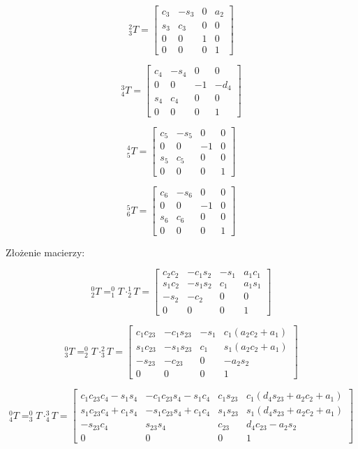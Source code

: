 \documentclass{article}
\begin{document}
\[
_{3}^{2}T=
\begin{bmatrix}
c_3	&-s_3	&0	&a_2	\\
s_3	&c_3	&0	&0	\\
0	&0	&1	&0	\\
0	&0	&0	&1	
 \end{bmatrix}
\]

\[
_{4}^{3}T=
\begin{bmatrix}
c_4	&-s_4	&0	&0	\\
0	&0	&-1	&-d_4	\\
s_4	&c_4	&0	&0	\\
0	&0	&0	&1
 \end{bmatrix}
\]

\[
_{5}^{4}T=
\begin{bmatrix}
c_5	&-s_5	&0	&0	\\
0	&0	&-1	&0	\\
s_5	&c_5	&0	&0	\\
0	&0	&0	&1	
 \end{bmatrix}
\]

\[
_{6}^{5}T=
\begin{bmatrix}
c_6	&-s_6	&0	&0	\\
0	&0	&-1	&0	\\
s_6	&c_6	&0	&0	\\
0	&0	&0	&1		
 \end{bmatrix}
\]

Złożenie macierzy:

\[
_{2}^{0}T= _{1}^{0}T \cdot _{2}^{1}T = 
\begin{bmatrix}
c_2c_2	&- c_1s_2	&-s_1	&a_1c_1	\\
s_1c_2	&-s_1s_2	&c_1	&a_1s_1	\\
-s_2	&-c_2	&0	&0	\\
0	&0	&0	&1	
 \end{bmatrix}
\]

\[
_{3}^{0}T= _{2}^{0}T \cdot _{3}^{2}T = 
\begin{bmatrix}
c_1c_{23}	&-c_1s_{23}	&-s_1	&c_1(a_2c_2+a_1)	\\
s_1c_{23}	&-s_1s_{23}	&c_1	&s_1(a_2c_2+a_1)	\\
-s_{23}	&-c_{23}	&0	&-a_2s_2	\\
0		&0		&0	&1	
 \end{bmatrix}
\]

\[
_{4}^{0}T= _{3}^{0}T \cdot _{4}^{3}T = 
\begin{bmatrix}
c_1c_{23}c_4 - s_1s_4	&-c_1c_{23}s_4 - s_1c_4	&c_1s_{23}	&c_1(d_4s_{23}+a_2c_2+a_1)	\\
s_1c_{23}c_4+c_1s_4	&-s_1c_{23}s_4+c_1c_4	&s_1s_{23}	&s_1(d_4s_{23}+a_2c_2+a_1)	\\
-s_{23}c_4	&s_{23}s_4	&c_{23}	&d_4c_{23}-a_2s_2	\\
0	&0	&0	&1
 \end{bmatrix}
\]
\end{document}
